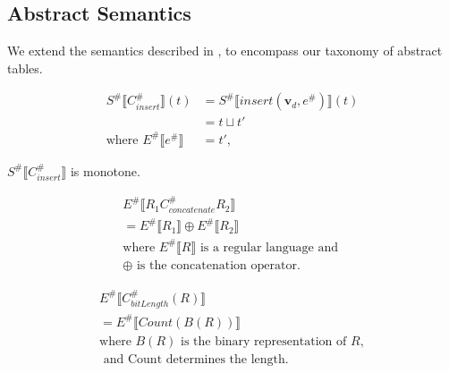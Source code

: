 \subsection{Abstract Semantics}

We extend the semantics described in \cite{halder_abstract_2012}, to encompass our taxonomy of abstract tables.

\begin{align*}
    S^\# \llbracket C_{insert}^\# \rrbracket (t) &= S^\# \llbracket insert(\mathbf{v}_d, e^\#) \rrbracket (t) \\
    &= t \sqcup t' \\
    \text{where } E^\# \llbracket e^\# \rrbracket &= t',
\end{align*}

\begin{lemma}
    $S^\# \llbracket C_{insert}^\# \rrbracket$ is monotone.
\end{lemma}

\begin{align*}
    E^\# \llbracket R_1 C_{concatenate}^\# R_2 \rrbracket \\
    = E^\# \llbracket R_1 \rrbracket \oplus  E^\# \llbracket R_2 \rrbracket \\
    \text{where } E^\# \llbracket R \rrbracket \text{ is a regular language and }\\
     \oplus \text{ is the concatenation operator.}
\end{align*}

\begin{align*}
    E^\# \llbracket C_{bitLength}^\# (R) \rrbracket \\
    = E^\# \llbracket Count(B(R)) \rrbracket \\
    \text{where } B(R) \text{ is the binary representation of }R, \\ \text{ and Count determines the length.}
\end{align*}

